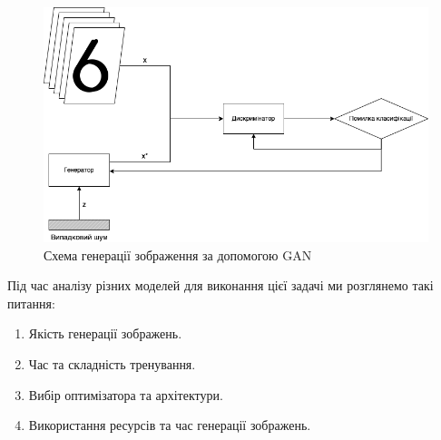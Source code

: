 \documentclass{article}
\begin{document}
	\begin{figure}[H]
		\centering
		\includegraphics[scale=0.3]{scheme.png}
		\caption{Схема генерації зображення за допомогою GAN}
	\end{figure}
	Під час аналізу різних моделей для виконання цієї задачі ми розглянемо такі питання:
	\begin{enumerate}
		\item Якість генерації зображень.
		\item Час та складність тренування.
		\item Вибір оптимізатора та архітектури.
		\item Використання ресурсів та час генерації зображень.
	\end{enumerate}
\end{document}
